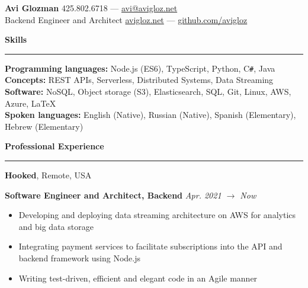 \documentclass[10pt]{article}
\begin{document}
	\pagestyle{empty}
	\begin{center}
		{\huge \textbf{Avi Glozman}} {\large \hfill 425.802.6718 --- \href{mailto:avi@avigloz.net}{avi@avigloz.net}}\\
		{\large Backend Engineer and Architect \hfill \href{https://avigloz.net}{avigloz.net} --- \href{https://github.com/avigloz}{github.com/avigloz}}
	\end{center}
	
	\begin{flushleft}	
		\vspace{-0.5mm}
		{\large \raggedright \textbf{Skills}}
		\vspace{1.25mm}
	
		\hrule
	
		\vspace{2.25mm}
		\textbf{Programming languages:} Node.js (ES6), TypeScript, Python, C\verb!#!, Java\\
		\vspace{0.5mm}
		\textbf{Concepts:} REST APIs, Serverless, Distributed Systems, Data Streaming\\
		\vspace{0.5mm}
		\textbf{Software:} NoSQL, Object storage (S3), Elasticsearch, SQL, Git, Linux, AWS, Azure, \LaTeX\\ 
		\vspace{0.5mm}
		\textbf{Spoken languages:} English (Native), Russian (Native), Spanish (Elementary),  Hebrew (Elementary)

		\vspace{1.5mm}
		{\large \raggedright \textbf{Professional Experience}}
		\vspace{1.25mm}
	
		\hrule

		\vspace{2.25mm}

		\textbf{Hooked}, Remote, USA\\
		\begin{leftli}
			{\small \textbf{Software Engineer and Architect, Backend}} \hfill \textit{\small Apr. 2021 $\rightarrow$ Now}
			\begin{itemize}
				\item Developing and deploying data streaming architecture on AWS for analytics and big data storage
				\vspace{-2mm}
				\item Integrating payment services to facilitate subscriptions into the API and backend framework using Node.js
				\vspace{-2mm}
				\item Writing test-driven, efficient and elegant code in an Agile manner
			\end{itemize}
		\end{leftli}


\end{flushleft}
\end{document}
